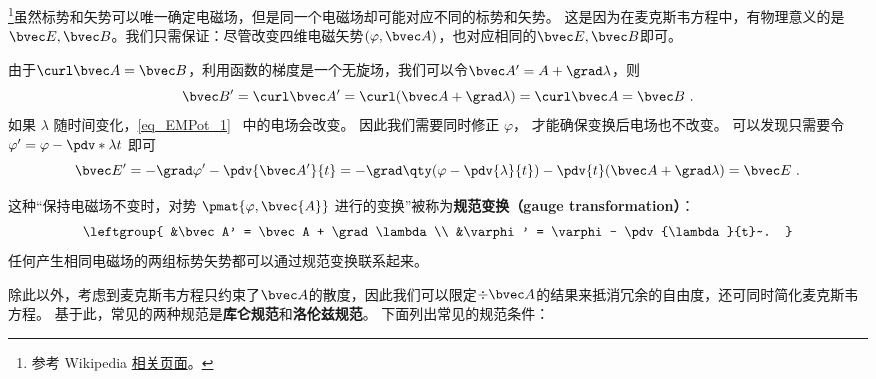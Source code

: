 
\begin{issues}
\issueDraft 
\end{issues}


\footnote{参考 Wikipedia \href{https://en.wikipedia.org/wiki/Gauge_fixing}{相关页面}。}虽然标势和矢势可以唯一确定电磁场，但是同一个电磁场却可能对应不同的标势和矢势。 这是因为在麦克斯韦方程中，有物理意义的是$\bvec E,\bvec B$。我们只需保证：尽管改变四维电磁矢势$(\varphi,\bvec A)$，也对应相同的$\bvec E,\bvec B$即可。

由于$\curl  \bvec A=\bvec B$，利用函数的梯度是一个无旋场，我们可以令$\bvec A'=A+\grad\lambda$，则
\begin{equation}
\bvec B' = \curl \bvec A' = \curl (\bvec A + \grad \lambda) = \curl \bvec A = \bvec B~.
\end{equation}
 如果 $\lambda$ 随时间变化，\autoref{eq_EMPot_1}~ 中的电场会改变。 因此我们需要同时修正 $\varphi$， 才能确保变换后电场也不改变。 可以发现只需要令 $\varphi' = \varphi - \pdv*{\lambda}{t}$ 即可
\begin{equation}
\bvec E' = -\grad \varphi' - \pdv{\bvec A'}{t} = -\grad \qty(\varphi - \pdv{\lambda}{t}) - \pdv{t} (\bvec A + \grad \lambda) = \bvec E~.
\end{equation}


这种“保持电磁场不变时，对势 $\pmat{\varphi, \bvec{A}}$ 进行的变换”被称为\textbf{规范变换（gauge transformation）}：
\begin{equation}\label{eq_Gauge_3}
\leftgroup{
&\bvec A' = \bvec A + \grad \lambda\\
&\varphi' = \varphi - \pdv{\lambda}{t}~.
}\end{equation}
任何产生相同电磁场的两组标势矢势都可以通过规范变换联系起来。

除此以外，考虑到麦克斯韦方程只约束了$\bvec A$的散度，因此我们可以限定$\div \bvec A$的结果来抵消冗余的自由度，还可同时简化麦克斯韦方程。
基于此，常见的两种规范是\textbf{库仑规范}和\textbf{洛伦兹规范}。
下面列出常见的规范条件：
